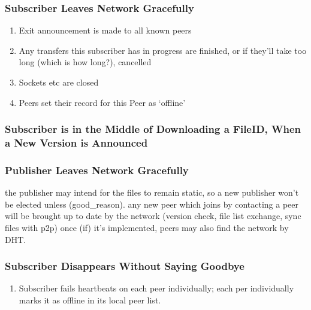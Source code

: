 \documentclass[12pt,a4paper,]{book}
\begin{document}
\subsubsection{Subscriber Leaves Network
Gracefully}\label{subscriber-leaves-network-gracefully}

\begin{enumerate}
\def\labelenumi{\arabic{enumi}.}
\itemsep1pt\parskip0pt
\item
  Exit announcement is made to all known peers
\item
  Any transfers this subscriber has in progress are finished, or if
  they'll take too long (which is how long?), cancelled
\item
  Sockets etc are closed
\item
  Peers set their record for this Peer as `offline'
\end{enumerate}

\subsubsection{Subscriber is in the Middle of Downloading a FileID, When
a New Version is
Announced}\label{subscriber-is-in-the-middle-of-downloading-a-fileid-when-a-new-version-is-announced}

\subsubsection{Publisher Leaves Network
Gracefully}\label{publisher-leaves-network-gracefully}

the publisher may intend for the files to remain static, so a new
publisher won't be elected unless (good\_reason). any new peer which
joins by contacting a peer will be brought up to date by the network
(version check, file list exchange, sync files with p2p) once (if) it's
implemented, peers may also find the network by DHT.

\subsubsection{Subscriber Disappears Without Saying
Goodbye}\label{subscriber-disappears-without-saying-goodbye}

\begin{enumerate}
\def\labelenumi{\arabic{enumi}.}
\itemsep1pt\parskip0pt
\item
  Subscriber fails heartbeats on each peer individually; each per
  individually marks it as offline in its local peer list.
\end{enumerate}
\end{document}
